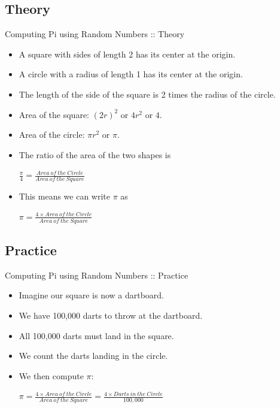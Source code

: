 \documentclass{beamer}
\begin{document}
\subsection{Theory}

\begin{frame}{Computing Pi using Random Numbers :: Theory}

\begin{itemize}
    \item A square with sides of length 2 has its center at the origin.
    \item A circle with a radius of length 1 has its center at the origin.
    \item The length of the side of the square is 2 times the radius of the circle. 
\item Area of the square: $(2r)^2$ or $4r^2$ or $4$.
\item Area of the circle: $\pi r^2$ or $\pi$.

\item The ratio of the area of the two shapes is

\begin{math}
\frac{\pi}{4} = \frac{Area\:of\:the\:Circle}{Area\:of\:the\:Square}
\end{math}

\item This means we can write $\pi$ as

\begin{math}
\pi = \frac{4 \times Area\:of\:the\:Circle}{Area\:of\:the\:Square}
\end{math}

\end{itemize}
\end{frame}

\subsection{Practice}

\begin{frame}{Computing Pi using Random Numbers :: Practice}

\begin{itemize}
\item Imagine our square is now a dartboard.
\item We have 100,000 darts to throw at the dartboard.
\item All 100,000 darts must land in the square.
\item We count the darts landing in the circle.
\item We then compute $\pi$:

\begin{math}
\pi = \frac{4 \times Area\:of\:the\:Circle}{Area\:of\:the\:Square} = \frac{4 \times Darts\:in\:the\:Circle}{100,000}
\end{math}

\end{itemize}
\end{frame}
\end{document}
